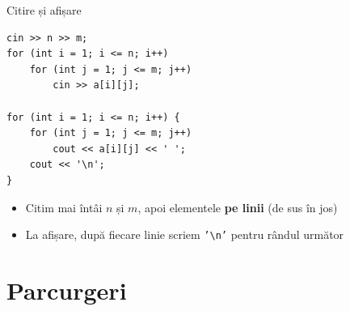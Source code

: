 ﻿\documentclass{beamer}
\begin{document}
\begin{frame}[fragile]{Citire și afișare}
  \begin{lstlisting}
cin >> n >> m;
for (int i = 1; i <= n; i++)
    for (int j = 1; j <= m; j++)
        cin >> a[i][j];

for (int i = 1; i <= n; i++) {
    for (int j = 1; j <= m; j++)
        cout << a[i][j] << ' ';
    cout << '\n';
}
  \end{lstlisting}

  \begin{itemize}
    \item Citim mai întâi $n$ și $m$, apoi elementele \textbf{pe linii} (de sus în jos)
    \item La afișare, după fiecare linie scriem \texttt{'\textbackslash{}n'} pentru rândul următor
  \end{itemize}
\end{frame}

\section{Parcurgeri}
\end{document}
